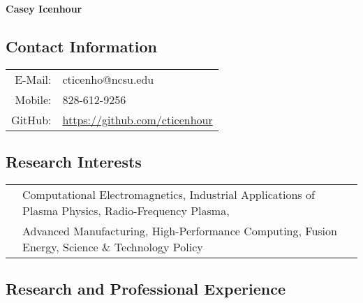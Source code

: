 \documentclass{article}
\begin{document}
\begin{center}
	{\huge \textbf{Casey Icenhour}}
\end{center}

\subsection*{Contact Information}

\begin{tabularx}{\textwidth}{r l}
	\hspace{3em} E-Mail:  & \hspace{2em} cticenho@ncsu.edu \\
	\hspace{3em} Mobile: & \hspace{2em} 828-612-9256 \\
	\hspace{3em} GitHub: & \hspace{2em} \url{https://github.com/cticenhour} \\
\end{tabularx}

\subsection*{Research Interests}

\begin{tabularx}{\textwidth}{l X}
	& \hspace{1.5em} Computational Electromagnetics, Industrial Applications of Plasma Physics, Radio-Frequency Plasma, \\
	& \hspace{1.5em} Advanced Manufacturing, High-Performance Computing, Fusion Energy, Science \& Technology Policy \\
\end{tabularx}

\subsection*{Research and Professional Experience}
\end{document}
